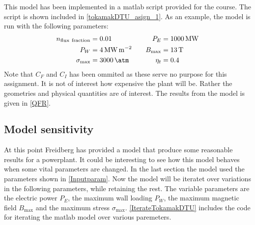This model has been implemented in a matlab script provided for the course. The script is shown included in \cref{tokamakDTU_asign_1}.
As an example, the model is run with the following parameters:
\begin{alignat}{3}
	n_\mathrm{flux \ fraction} & = 0.01                                 & \quad P_E      & = \SI{1000}{\mega\watt} \nonumber       \\
	P_W                        & = \SI{4}{\mega\watt\per\meter\squared} & \quad B_{\max} & = \SI{13}{\tesla}    \label{Inputparam} \\
	\sigma_{\max}              & = \SI{3000}{\atm}                      & \quad \eta_t   & = 0.4 \nonumber
\end{alignat}
Note that \(C_F\) and \(C_I\) has been ommited as these serve no purpose for this assignment. It is not of interest how expensive the plant will be. Rather the geometries and physical quantities are of interest.
The results from the model is given in \cref{QFR}.
\subsection{Model sensitivity}
At this point Freidberg has provided a model that produce some reasonable results for a powerplant. It could be interesting to see how this model behaves when some vital parameters are changed. In the last section the model used the parameters shown in \cref{Inputparam}. Now the model will be iteratet over variations in the following parameters, while retaining the rest.
The variable parameters are the electric power \(P_E\), the maximum wall loading \(P_W\), the maximum magnetic field \(B_{\max}\) and the maximum stress \(\sigma_{\max}\).
\cref{IterateTokamakDTU} includes the code for iterating the matlab model over various paremeters.

